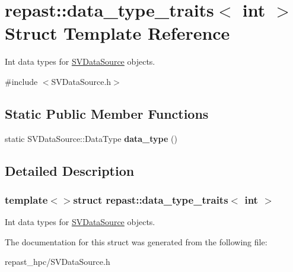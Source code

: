 \hypertarget{structrepast_1_1data__type__traits_3_01int_01_4}{\section{repast\-:\-:data\-\_\-type\-\_\-traits$<$ int $>$ Struct Template Reference}
\label{structrepast_1_1data__type__traits_3_01int_01_4}
}


Int data types for \hyperlink{classrepast_1_1_s_v_data_source}{S\-V\-Data\-Source} objects.  




{\ttfamily \#include $<$S\-V\-Data\-Source.\-h$>$}

\subsection*{Static Public Member Functions}
\begin{DoxyCompactItemize}
\item 
\hypertarget{structrepast_1_1data__type__traits_3_01int_01_4_a0a060997b4e9c8dc6134925c5775a066}{static S\-V\-Data\-Source\-::\-Data\-Type {\bfseries data\-\_\-type} ()}\label{structrepast_1_1data__type__traits_3_01int_01_4_a0a060997b4e9c8dc6134925c5775a066}

\end{DoxyCompactItemize}


\subsection{Detailed Description}
\subsubsection*{template$<$$>$struct repast\-::data\-\_\-type\-\_\-traits$<$ int $>$}

Int data types for \hyperlink{classrepast_1_1_s_v_data_source}{S\-V\-Data\-Source} objects. 

The documentation for this struct was generated from the following file\-:\begin{DoxyCompactItemize}
\item 
repast\-\_\-hpc/S\-V\-Data\-Source.\-h\end{DoxyCompactItemize}
